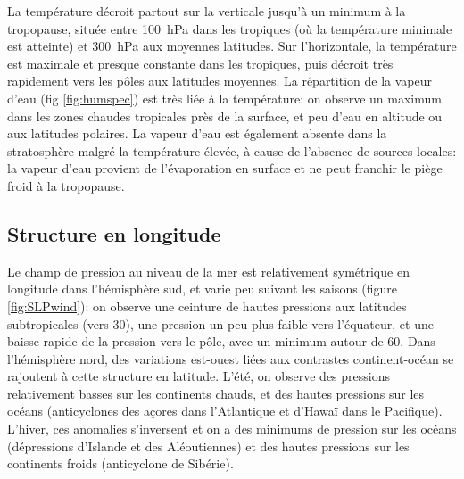 
\sk
La température décroit partout sur la verticale jusqu'à un minimum à la tropopause, située entre 100~hPa dans les tropiques (où la température minimale est atteinte) et 300~hPa aux moyennes latitudes. Sur l'horizontale, la température est maximale et presque constante dans les tropiques, puis décroit très rapidement vers les pôles aux latitudes moyennes. La répartition de la vapeur d'eau (fig \ref{fig:humspec}) est très liée à la température: on observe un maximum dans les zones chaudes tropicales près de la surface, et peu d'eau en altitude ou aux latitudes polaires. La vapeur d'eau est également absente dans la stratosphère malgré la température élevée, à cause de l'absence de sources locales: la vapeur d'eau provient de l'évaporation en surface et ne peut franchir le piège froid à la tropopause.



 

\sk
\subsection{Structure en longitude}

\sk
Le champ de pression au niveau de la mer est relativement symétrique en longitude dans l'hémisphère sud, et varie peu suivant les saisons (figure \ref{fig:SLPwind}): on observe une ceinture de hautes pressions aux latitudes subtropicales (vers 30\deg), une pression un peu plus faible vers l'équateur, et une baisse rapide de la pression vers le pôle, avec un minimum autour de 60\deg. Dans l'hémisphère nord, des variations est-ouest liées aux contrastes continent-océan se rajoutent à cette structure en latitude. L'été, on observe des pressions relativement basses sur les continents chauds, et des hautes pressions sur les océans (anticyclones des açores dans l'Atlantique et d'Hawaï dans le Pacifique). L'hiver, ces anomalies s'inversent et on a des minimums de pression sur les océans (dépressions d'Islande et des Aléoutiennes) et des hautes pressions sur les continents froids (anticyclone de Sibérie).

